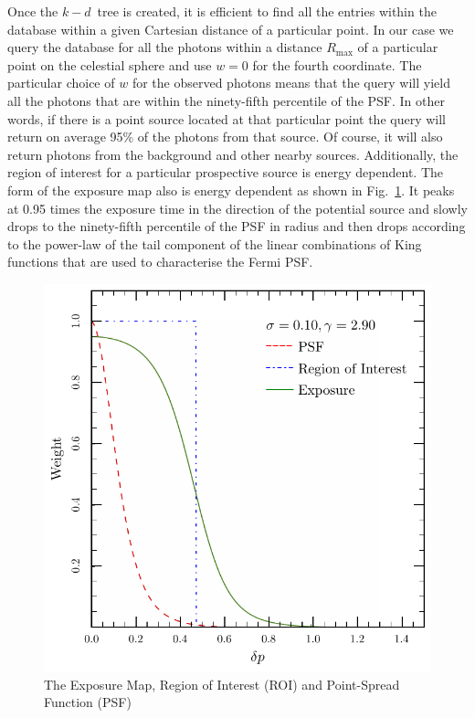 \documentclass[useAMS,usenatbib]{mn2e}
\begin{document}
Once the $k-d$~tree is created, it is efficient to find all the
entries within the database within a given Cartesian distance of a
particular point.  In our case we query the database for all the
photons within a distance $R_\mathrm{max}$ of a particular point on
the celestial sphere and use $w=0$ for the fourth coordinate.  The
particular choice of $w$ for the observed photons means that the query
will yield all the photons that are within the ninety-fifth
percentile of the PSF.  In other words, if there is a point source
located at that particular point the query will return on average 95\%
of the photons from that source.  Of course, it will also return
photons from the background and other nearby sources.  Additionally,
the region of interest for a particular prospective source is energy
dependent.  The form of the exposure map also is energy dependent as
shown in Fig.~\ref{fig:expmap}.  It peaks at 0.95 times the exposure
time in the direction of the potential source and slowly drops to the
ninety-fifth percentile of the PSF in radius and then drops according
to the power-law of the tail component of the linear combinations of
King functions that are used to characterise the Fermi PSF. 
\begin{figure}
\includegraphics[width=\columnwidth]{expmap2}
\caption{The Exposure Map, Region of Interest (ROI)
  and Point-Spread Function (PSF)}
\label{fig:expmap}
\end{figure}
\end{document}
